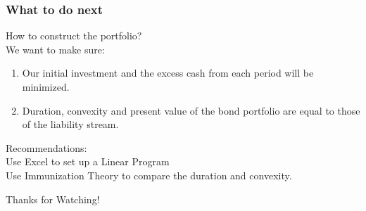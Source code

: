 \documentclass[compress,handout,10pt]{beamer}
\let\olditem\item
\renewcommand{\item}{\setlength{\itemsep}{0.5\baselineskip}\olditem}
\begin{document}
\begin{frame}
    \frametitle{What to do next}
How to construct the portfolio? \\
\vspace{3mm}
We want to make sure: 
\begin{enumerate}
\item Our initial investment and the excess cash from each period will be minimized.
\item Duration, convexity and present value of the bond portfolio are equal to those of the liability stream.
\end{enumerate}
\vspace{5mm}
Recommendations: \\
\vspace{1mm}
Use Excel to set up a Linear Program\\
\vspace{2mm}
Use Immunization Theory to compare the duration and convexity.
\end{frame}

\begin{frame}
\Huge\centerline {Thanks for Watching!}
\end{frame}
\end{document}

